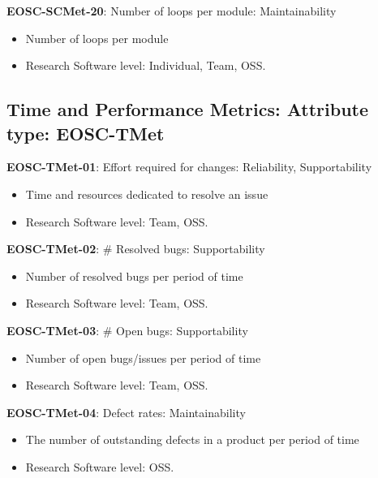\textbf{EOSC-SCMet-20}: Number of loops per module: Maintainability

\begin{itemize}
    \item Number of loops per module \cite{ogasawara_experiences_1996}
    \item Research Software level: Individual, Team, OSS.
\end{itemize}

\subsection{Time and Performance Metrics: Attribute type: EOSC-TMet}

\textbf{EOSC-TMet-01}: Effort required for changes: Reliability, Supportability

\begin{itemize}
    \item Time and resources dedicated to resolve an issue \cite{montagud_systematic_2012}
    \item Research Software level: Team, OSS.
\end{itemize}

\textbf{EOSC-TMet-02}: \# Resolved bugs: Supportability

\begin{itemize}
    \item Number of resolved bugs per period of time \cite{montagud_systematic_2012}
    \item Research Software level: Team, OSS.
\end{itemize}

\textbf{EOSC-TMet-03}: \# Open bugs: Supportability

\begin{itemize}
    \item Number of open bugs/issues per period of time \cite{montagud_systematic_2012}
    \item Research Software level: Team, OSS.
\end{itemize}

\textbf{EOSC-TMet-04}: Defect rates: Maintainability

\begin{itemize}
    \item The number of outstanding defects in a product per period of time \cite{crispin_driving_2006}
    \item Research Software level: OSS.
\end{itemize}

